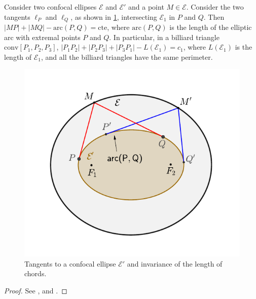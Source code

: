  \begin{proposition} 
 	  \label{prop:dar1} Consider two confocal ellipses $\mathcal E$ and $\mathcal{E}'$ and a point $M\in\mathcal E$. Consider the   two tangents $\ell_P$ and $\ell_Q$,  as shown in   \cref{fig:da_cordas}, intersecting $\mathcal{E}_1$ in $P$ and $Q$. Then $|MP|+|MQ|-\text{arc}{(P,Q)}=\mathrm{cte}$, where $\text{arc}(P,Q)$ is the length of the elliptic arc with extremal points   $P$ and $Q$. In particular, in a   billiard triangle $\text{conv}[P_1,P_2,P_3]$,  $|P_1P_2|+|P_2P_3|+|P_3P_1|-L(\mathcal{E}_1  )=  c_1$, where $L(\mathcal{E}_1) $ is the length of $\mathcal{E}_1$, and all the billiard triangles have the same perimeter.
 \label{prop:09-graves}	
 \end{proposition}
 \begin{figure}
 \begin{center}
   \includegraphics[scale=0.7]{chap_09/pics/pics_09_020_graves.pdf}
		\caption{ Tangents to a confocal  ellipse $\mathcal{E}'$ and invariance of the length of chords.}
		\label{fig:da_cordas}
 	\end{center}
\end{figure}
 
 \begin{proof}
 See \cite{chasles1843}, \cite[pp. 283-284]{darboux1917} and \cite[pp. 115-116]{carneiro2005}. 
 \end{proof}
 
